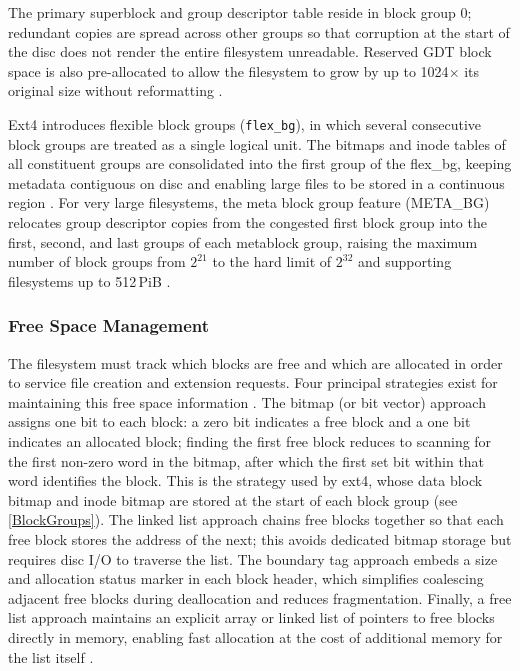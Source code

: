 The primary superblock and group descriptor table reside in block group 0; redundant copies are spread across other groups so that corruption at the start of the disc does not render the entire filesystem unreadable. Reserved GDT block space is also pre-allocated to allow the filesystem to grow by up to 1024$\times$ its original size without reformatting \parencite{KernelExt4BlockGroup}.

Ext4 introduces flexible block groups (\texttt{flex\_bg}), in which several consecutive block groups are treated as a single logical unit. The bitmaps and inode tables of all constituent groups are consolidated into the first group of the flex\_bg, keeping metadata contiguous on disc and enabling large files to be stored in a continuous region \parencite{KernelExt4BlockGroup}. For very large filesystems, the meta block group feature (META\_BG) relocates group descriptor copies from the congested first block group into the first, second, and last groups of each metablock group, raising the maximum number of block groups from $2^{21}$ to the hard limit of $2^{32}$ and supporting filesystems up to 512\,PiB \parencite{KernelExt4BlockGroup}.

\subsubsection{Free Space Management}
\label{FreeSpaceManagement}

The filesystem must track which blocks are free and which are allocated in order to service file creation and extension requests. Four principal strategies exist for maintaining this free space information \parencite{GFGFreeSpaceManagement,GFGOSFileSystems}. The bitmap (or bit vector) approach assigns one bit to each block: a zero bit indicates a free block and a one bit indicates an allocated block; finding the first free block reduces to scanning for the first non-zero word in the bitmap, after which the first set bit within that word identifies the block. This is the strategy used by ext4, whose data block bitmap and inode bitmap are stored at the start of each block group (see \autoref{BlockGroups}). The linked list approach chains free blocks together so that each free block stores the address of the next; this avoids dedicated bitmap storage but requires disc I/O to traverse the list. The boundary tag approach embeds a size and allocation status marker in each block header, which simplifies coalescing adjacent free blocks during deallocation and reduces fragmentation. Finally, a free list approach maintains an explicit array or linked list of pointers to free blocks directly in memory, enabling fast allocation at the cost of additional memory for the list itself \parencite{GFGFreeSpaceManagement}.

